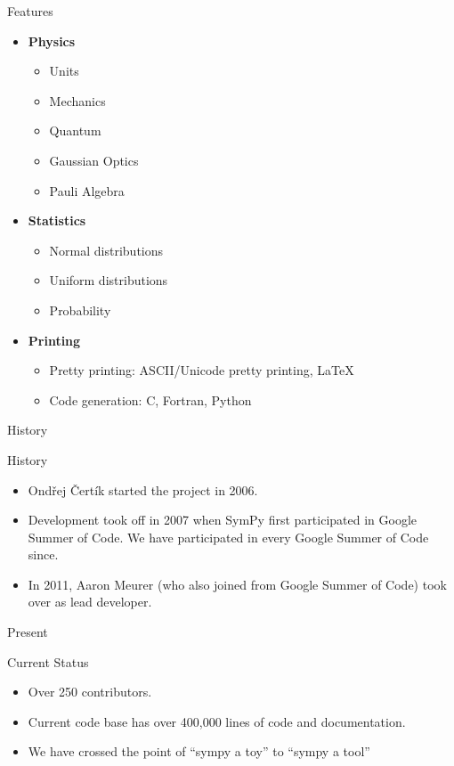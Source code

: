 \documentclass[xcolor=svgnames]{beamer}
\begin{document}
\begin{frame}{Features}
\begin{multicols}{2}
\begin{itemize}
    \item \textbf{Physics}
      \begin{itemize}
        \tiny
      \item Units
      \item Mechanics
      \item Quantum
      \item Gaussian Optics
      \item Pauli Algebra
      \end{itemize}

    \item \textbf{Statistics}
      \begin{itemize}
        \tiny
      \item Normal distributions
      \item Uniform distributions
      \item Probability
      \end{itemize}

    \item \textbf{Printing}
      \begin{itemize}
        \tiny
      \item Pretty printing: ASCII/Unicode pretty printing, LaTeX
      \item Code generation: C, Fortran, Python
      \end{itemize}
    \end{itemize}
  \end{multicols}
\end{frame}

\begin{frame}{History}
  \begin{block}{History}
    \begin{itemize}
    \item Ondřej Čertík started the project in 2006.
    \item Development took off in 2007 when SymPy first participated in Google
      Summer of Code. We have participated in every Google Summer of Code since.
    \item In 2011, Aaron Meurer (who also joined from Google Summer of Code) took
      over as lead developer.
    \end{itemize}
  \end{block}
\end{frame}

\begin{frame}{Present}
  \begin{block}{Current Status}
    \begin{itemize}
    \item Over 250 contributors.
    \item Current code base has over 400,000 lines of code and documentation.
    \item We have crossed the point of ``sympy a toy'' to ``sympy a tool''
    \end{itemize}
  \end{block}
\end{frame}
\end{document}
